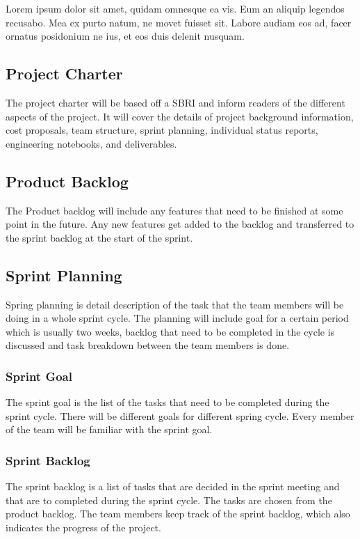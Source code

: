 Lorem ipsum dolor sit amet, quidam omnesque ea vis. Eum an aliquip legendos recusabo. Mea ex purto natum, ne movet fuisset sit. Labore audiam eos ad, facer ornatus posidonium ne ius, et eos duis delenit nusquam.

\subsection{Project Charter}
The project charter will be based off a SBRI and inform readers of the different aspects of the project. It will cover the details of project background information, cost proposals, team structure, sprint planning, individual status reports, engineering notebooks, and deliverables.

\subsection{Product Backlog}
The Product backlog will include any features that need to be finished at some point in the future. Any new features get added to the backlog and transferred to the sprint backlog at the start of the sprint.

\subsection{Sprint Planning}
Spring planning is detail description of the task that the team members will be doing in a whole sprint cycle. The planning will include goal for a certain period which is usually two weeks, backlog that need to be completed in the cycle is discussed and task breakdown between the team members is done. 

\subsubsection{Sprint Goal}
The sprint goal is the list of the tasks that need to be completed during the sprint cycle. There will be different goals for different spring cycle. Every member of the team will be familiar with the sprint goal.

\subsubsection{Sprint Backlog}
The sprint backlog is a list of tasks that are decided in the sprint meeting and that are to completed during the sprint cycle. The tasks are chosen from the product backlog. The team members keep track of the sprint backlog, which also indicates the progress of the project.


